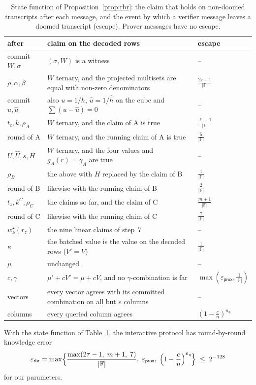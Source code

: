 \documentclass[sigconf,anonymous]{acmart}
\newcommand{\F}{\mathbb{F}}
\newcommand{\msk}[1]{#1^{\star}}
\newcommand{\epsprox}{\varepsilon_{\mathsf{prox}}}
\newcommand{\epsrbr}{\varepsilon_{\mathsf{rbr}}}
\newcommand{\nq}{n_{\mathsf{q}}}
\newcommand{\uh}{\hat{u}}
\newcommand{\hh}{\hat{h}}
\begin{document}
\begin{table}[t]
\caption{State function of Proposition~\ref{prop:rbr}: the claim that holds on non-doomed
transcripts after each message, and the event by which a verifier message leaves a doomed
transcript (escape). Prover messages have no escape.}
\label{tab:rbr}
\small
\begin{tabular}{@{}p{}p{}l@{}}
\toprule
after & claim on the decoded rows & escape\\
\midrule
commit $W,\sigma$ & $(\sigma,W)$ is a witness & --\\
$\rho,\alpha,\beta$ & $W$ ternary, and the projected multisets are equal with non-zero denominators & $\frac{2\tau-1}{|\F|}$\\
commit $u,\uh$ & also $u=1/h$, $\uh=1/\hh$ on the cube and $\sum(u-\uh)=0$ & --\\
$t_c,k,\rho_A$ & $W$ ternary, and the claim of A is true & $\frac{\ell+1}{|\F|}$\\
round of A & $W$ ternary, and the running claim of A is true & $\frac{5}{|\F|}$\\
$U,\hat U,s,H$ & $W$ ternary, and the four values and $g_A(r)=\gamma_A$ are true & --\\
$\rho_B$ & the above with $H$ replaced by the claim of B & $\frac{1}{|\F|}$\\
round of B & likewise with the running claim of B & $\frac{2}{|\F|}$\\
$t_z,k^C,\rho_C$ & the claims so far, and the claim of C & $\frac{m+1}{|\F|}$\\
round of C & likewise with the running claim of C & $\frac{7}{|\F|}$\\
$\msk{w}_k(r_z)$ & the nine linear claims of step~7 & --\\
$\kappa$ & the batched value is the value on the decoded rows ($V'=V$) & $\frac{1}{|\F|}$\\
$\mu$ & unchanged & --\\
$c,\gamma$ & $\mu'+cV'=\mu+cV$, and no $\gamma$-combination is far & $\max(\epsprox,\frac{1}{|\F|})$\\
vectors & every vector agrees with its committed combination on all but $e$ columns & --\\
columns & every queried column agrees & $(1-\frac{e}{n})^{\nq}$\\
\bottomrule
\end{tabular}
\end{table}

\begin{proposition}\label{prop:rbr}
With the state function of Table~\ref{tab:rbr}, the interactive protocol has round-by-round
knowledge error
\[
  \epsrbr=\max\Bigl\{\frac{\max(2\tau-1,\;m+1,\;7)}{|\F|},\;\epsprox,\;\Bigl(1-\frac{e}{n}\Bigr)^{\nq}\Bigr\}
  \;\le\;2^{-128}
\]
for our parameters.
\end{proposition}
\end{document}
